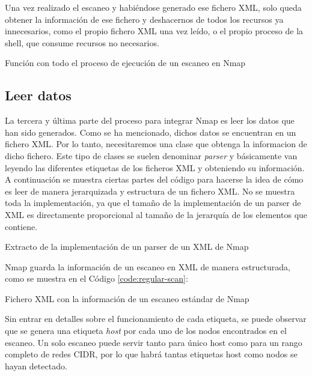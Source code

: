 Una vez realizado el escaneo y habiéndose generado ese fichero XML, solo queda obtener la información de ese fichero y deshacernos de todos los recursos ya innecesarios, como el propio fichero XML una vez leído, o el propio proceso de la shell, que consume recursos no necesarios.

\begin{code}
	\caption{Función con todo el proceso de ejecución de un escaneo en Nmap}
	\label{code:runScan}
	
\end{code}

\subsection{Leer datos}

La tercera y última parte del proceso para integrar Nmap es leer los datos que han sido generados. Como se ha mencionado, dichos datos se encuentran en un fichero XML. Por lo tanto, necesitaremos una clase que obtenga la informacion de dicho fichero. Este tipo de clases se suelen denominar \textit{parser} y básicamente van leyendo las diferentes etiquetas de los ficheros XML y obteniendo su información. A continuación se muestra ciertas partes del código para hacerse la idea de cómo es leer de manera jerarquizada y estructura de un fichero XML. No se muestra toda la implementación, ya que el tamaño de la implementación de un parser de XML es directamente proporcional al tamaño de la jerarquía de los elementos que contiene.

\begin{code}
	\caption{Extracto de la implementación de un parser de un XML de Nmap}
	
	\label{code:nmapParser}
\end{code}

Nmap guarda la información de un escaneo en XML de manera estructurada, como se muestra en el Código \autoref{code:regular-scan}:

\begin{code}
	\caption{Fichero XML con la información de un escaneo estándar de Nmap}
	\label{code:regular-scan}
	
\end{code}

Sin entrar en detalles sobre el funcionamiento de cada etiqueta, se puede observar que se genera una etiqueta \textit{host} por cada uno de los nodos encontrados en el escaneo. Un solo escaneo puede servir tanto para único host como para un rango completo de redes CIDR, por lo que habrá tantas etiquetas host como nodos se hayan detectado.

